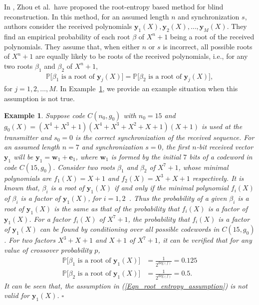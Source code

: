 \documentclass[10pt,journal]{IEEEtran}
\newtheorem{example}{Example}
\def \deg{{\mathrm{deg}}}
\begin{document}
In \cite{Zhou2013_Entropy},  Zhou et al.~have proposed the root-entropy based method for blind reconstruction.
% 
In this method, for an assumed length $n$ and synchronization $s$, 
authors consider the received polynomials $\mathbf{y}_1(X), \mathbf{y}_2(X), \ldots, \mathbf{y}_M(X)$.
They find an empirical probability of each root $\beta$ of $X^n+1$ being a root of the received polynomials.
They assume that, when either $n$ or $s$ is incorrect, all possible roots of $X^n+1$ are equally likely to be roots
of the received polynomials, i.e., for any two roots $\beta_1$ and $\beta_2$ of $X^n+1$,
% 
\begin{align}
%  
\mathbb{P} \Big[ \beta_1 \mbox{ is a root of } \mathbf{y}_j(X) \Big] = \mathbb{P} \Big[ \beta_2 \mbox{ is a root of } \mathbf{y}_j(X) \Big],
\label{Eqn_root_entropy_assumption}
% 
\end{align}
% 
for $j = 1,2,\ldots,M$.
In Example~\ref{Example_chinese_counterEx_root}, we provide an example situation when this assumption
is not true.
% 
\begin{example}
\label{Example_chinese_counterEx_root}
%  
Suppose code $C(n_0,g_0)$ with $n_0=15$ and $g_0(X) = (X^4+X^3+1)(X^4+X^3+X^2+X+1)(X+1)$ 
is used at the transmitter and $s_0=0$ is the correct synchronization of the received sequence.
For an assumed length $n=7$ and synchronization $s=0$,
the first $n$-bit received vector $\mathbf{y}_1$ will be $\mathbf{y}_1 = \mathbf{w}_1 + \mathbf{e}_1$, where
$\mathbf{w}_1$ is formed by the initial $7$ bits of a codeword in code $C(15,g_0)$.
% 
Consider two roots $\beta_1$ and $\beta_2$ of $X^7+1$, whose minimal polynomials are
$f_1(X) = X+1$ and $f_2(X) = X^3+X+1$ respectively.
It is known that, $\beta_i$ is a root of $\mathbf{y}_1(X)$ if and only if 
the minimal polynomial $f_i(X)$ of $\beta_i$ is a factor of $\mathbf{y}_1(X)$, for $i=1,2$~\cite[Sec.~2.2]{Lidl86}.
Thus the probability of a given $\beta_i$ is a root of $\mathbf{y}_1(X)$ is the same as that of 
the probability that $f_i(X)$ is a factor of $\mathbf{y}_1(X)$.
% 
For a factor $f_i(X)$ of $X^7+1$, the probability that $f_i(X)$ is a factor of $\mathbf{y}_1(X)$ can be found 
by conditioning over all possible codewords in $C(15,g_0)$.
For two factors $X^3+X+1$ and $X+1$ of $X^7+1$, it can be verified that for any value of crossover probability $p$,
% 
\begin{align*}
%  
\mathbb{P} \Big[ \beta_1 \mbox{ is a root of } \mathbf{y}_1(X) \Big] &= \frac{1}{2^{\deg(f)}} = 0.125 \\
\mathbb{P} \Big[ \beta_2 \mbox{ is a root of } \mathbf{y}_1(X) \Big] &= \frac{1}{2^{\deg(f)}} = 0.5.
% 
\end{align*}
%
It can be seen that, the assumption in (\ref{Eqn_root_entropy_assumption}) is not valid for $\mathbf{y}_1(X)$.
\hfill $\square$
% 
\end{example}
% 
\end{document}
